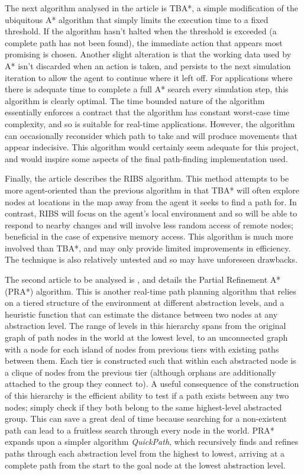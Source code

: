 \documentclass[a4paper,12pt]{article}
\begin{document}
The next algorithm analysed in the article is TBA*, a simple modification of the ubiquitous A* algorithm that simply limits the execution time to a fixed threshold. If the algorithm hasn't halted when the threshold is exceeded (a complete path has not been found), the immediate action that appears most promising is chosen. Another slight alteration is that the working data used by A* isn't discarded when an action is taken, and persists to the next simulation iteration to allow the agent to continue where it left off. For applications where there is adequate time to complete a full A* search every simulation step, this algorithm is clearly optimal. The time bounded nature of the algorithm essentially enforces a contract that the algorithm has constant worst-case time complexity, and so is suitable for real-time applications. However, the algorithm can occasionally reconsider which path to take and will produce movements that appear indecisive. This algorithm would certainly seem adequate for this project, and would inspire some aspects of the final path-finding implementation used.

Finally, the article describes the RIBS algorithm. This method attempts to be more agent-oriented than the previous algorithm in that TBA* will often explore nodes at locations in the map away from the agent it seeks to find a path for. In contrast, RIBS will focus on the agent's local environment and so will be able to respond to nearby changes and will involve less random access of remote nodes; beneficial in the case of expensive memory access. This algorithm is much more involved than TBA*, and may only provide limited improvements in efficiency. The technique is also relatively untested and so may have unforeseen drawbacks.

The second article to be analysed is , and details the Partial Refinement A* (PRA*) algorithm. This is another real-time path planning algorithm that relies on a tiered structure of the environment at different abstraction levels, and a heuristic function that can estimate the distance between two nodes at any abstraction level. The range of levels in this hierarchy spans from the original graph of path nodes in the world at the lowest level, to an unconnected graph with a node for each island of nodes from previous tiers with existing paths between them. Each tier is constructed such that within each abstracted node is a clique of nodes from the previous tier (although orphans are additionally attached to the group they connect to). A useful consequence of the construction of this hierarchy is the efficient ability to test if a path exists between any two nodes; simply check if they both belong to the same highest-level abstracted group. This can save a great deal of time because searching for a non-existent path can lead to a fruitless search through every node in the world. PRA* expands upon a simpler algorithm \emph{QuickPath}, which recursively finds and refines paths through each abstraction level from the highest to lowest, arriving at a complete path from the start to the goal node at the lowest abstraction level.
\end{document}
